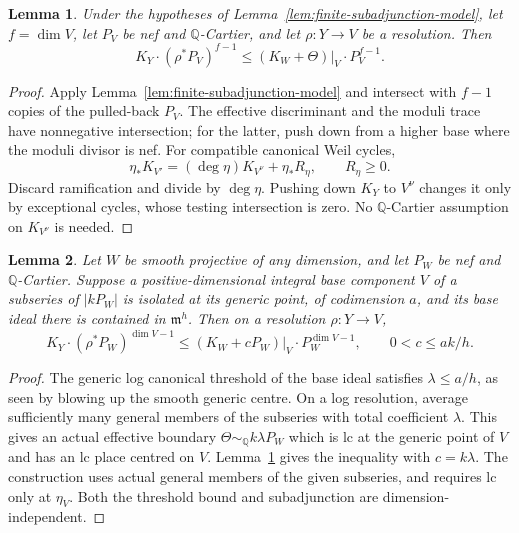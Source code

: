 \documentclass[12pt,a4paper,psamsfonts]{amsart}
\theoremstyle{definition}
\theoremstyle{plain}
\newtheorem{lemma}{Lemma}[section]
\newcommand{\Q}{\mathbb Q}
\begin{document}
\begin{lemma}\label{lem:generic-subadjunction}
Under the hypotheses of Lemma~\ref{lem:finite-subadjunction-model},
let $f=\dim V$, let $P_V$ be nef and $\mathbb{Q}$-Cartier, and let
$\rho:Y\to V$ be a resolution. Then
\[
 K_Y\cdot (\rho^*P_V)^{f-1}\le(K_W+\Theta)|_V \cdot P_V^{f-1}.
\]
\end{lemma}
\begin{proof}
Apply Lemma~\ref{lem:finite-subadjunction-model} and intersect with
$f-1$ copies of the pulled-back $P_V$. The effective discriminant
and the moduli trace have nonnegative intersection; for the latter,
push down from a higher base where the moduli divisor is nef.
For compatible canonical Weil cycles,
\[
 \eta_*K_{V'}=(\deg\eta)K_{V^\nu}+\eta_*R_\eta,
 \qquad R_\eta\ge0.
\]
Discard ramification and divide by $\deg\eta$. Pushing down $K_Y$
to $V^\nu$ changes it only by exceptional cycles, whose testing
intersection is zero. No $\mathbb{Q}$-Cartier assumption on
$K_{V^\nu}$ is needed.
\end{proof}

\begin{lemma}\label{lem:canonical-centre}
Let $W$ be smooth projective of any dimension, and let $P_W$
be nef and $\mathbb{Q}$-Cartier. Suppose a positive-dimensional integral base component $V$
of a subseries of $|kP_W|$ is isolated at its generic point,
of codimension $a$, and its base ideal there is contained in
$\mathfrak m^h$. Then on a resolution $\rho:Y\to V$,
\[
 K_Y\cdot (\rho^*P_W)^{\dim V-1}
 \le (K_W+cP_W)|_V \cdot P_W^{\dim V-1},
 \qquad 0<c\le ak/h.
\]
\end{lemma}
\begin{proof}
The generic log canonical threshold of the base ideal satisfies
$\lambda\le a/h$, as seen by blowing up the smooth generic
centre. On a log resolution, average sufficiently many general
members of the subseries with total coefficient $\lambda$.
This gives an actual effective boundary
$\Theta\sim_{\Q}k\lambda P_W$ which is lc at the generic
point of $V$ and has an lc place centred on $V$.
Lemma~\ref{lem:generic-subadjunction} gives the inequality with
$c=k\lambda$. The construction uses actual general members of
the given subseries, and requires lc only at $\eta_V$.
Both the threshold bound and subadjunction are dimension-independent.
\end{proof}
\end{document}
